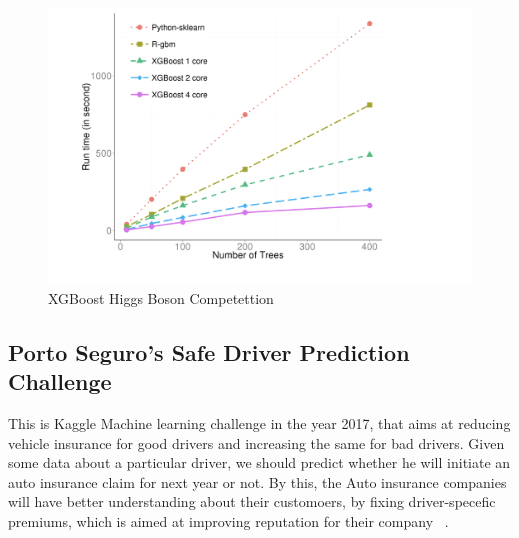 \begin{figure}[!ht]
  \centering\includegraphics[width=\columnwidth]{images/Runtime-vs-Number-of-trees.png}
  \caption{XGBoost Higgs Boson Competettion~\cite{hid-sp18-401-XGBoost-runtime-comparision-image}}
\label{f:XGBoost-runtime-comparision}
\end{figure}

\subsection{Porto Seguro's Safe Driver Prediction Challenge} 

This is Kaggle Machine learning challenge in the year 2017, that aims at
reducing vehicle insurance for good drivers and increasing the same for bad
drivers. Given some data about a particular driver, we should predict whether
he will initiate an auto insurance claim for next year or not. By this, the
Auto insurance companies  will have better understanding about their
customoers, by fixing driver-specefic premiums, which is aimed at improving
reputation for their company ~\cite{hid-sp18-401-Kaggle-Porto- Seguro}.


